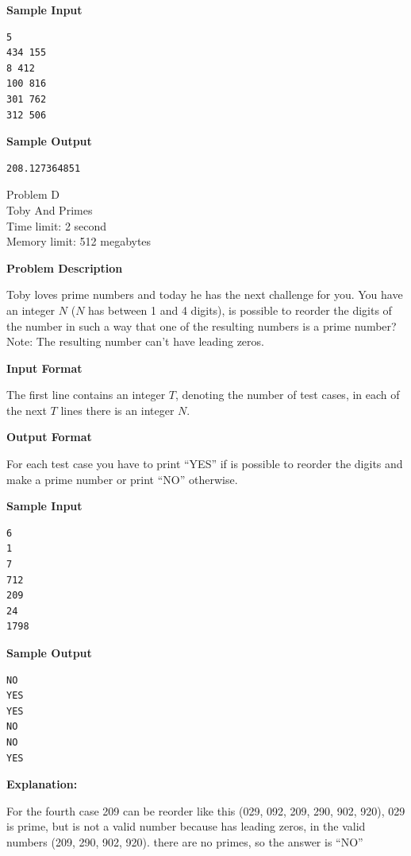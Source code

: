 \documentclass[11pt]{article}
\begin{document}
\textbf{\large Sample Input}

\begin{verbatim}
5
434 155
8 412
100 816
301 762
312 506
\end{verbatim}

\textbf{\large Sample Output}

\begin{verbatim}
208.127364851
\end{verbatim}

\newpage
        \begin{center}
            {\LARGE Problem D}\\
            {\Large Toby And Primes}\\
            {Time limit: 2 second}\\
            {Memory limit: 512 megabytes}
        \end{center}\textbf{\large Problem Description}

Toby loves prime numbers and today he has the next challenge for you.
You have an integer $N$ ($N$ has between 1 and 4 digits), is possible to reorder the
digits of the number in such a way that one of the resulting numbers is a prime number?
Note: The resulting number can't have leading zeros.

\textbf{\large Input Format}

The first line contains an integer $T$, denoting the number of test cases, in each of
the next $T$ lines there is an integer $N$.

\textbf{\large Output Format}

For each test case you have to print ``YES'' if is possible to reorder the digits and make
a prime number or print ``NO'' otherwise.

\textbf{\large Sample Input}

\begin{verbatim}
6
1
7
712
209
24
1798
\end{verbatim}

\textbf{\large Sample Output}

\begin{verbatim}
NO
YES
YES
NO
NO
YES
\end{verbatim}

\textbf{\large Explanation:}

For the fourth case 209 can be reorder like this (029, 092, 209, 290, 902, 920), 029 is prime,
but is not a valid number because has leading zeros, in the valid numbers (209, 290, 902, 920).
there are no primes, so the answer is ``NO''
\end{document}
